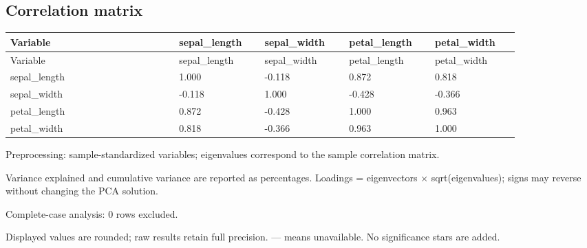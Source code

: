 \documentclass[UTF8]{ctexart}
\begin{document}
\subsection*{Correlation matrix}
\small
\setlength{\tabcolsep}{2pt}
\begin{longtable}{p{0.2867\linewidth}p{0.1433\linewidth}p{0.1433\linewidth}p{0.1433\linewidth}p{0.1433\linewidth}}
\toprule
Variable & sepal\_length & sepal\_width & petal\_length & petal\_width \\
\midrule
\endfirsthead
\toprule
Variable & sepal\_length & sepal\_width & petal\_length & petal\_width \\
\midrule
\endhead
sepal\_length & 1.000 & -0.118 & 0.872 & 0.818 \\
sepal\_width & -0.118 & 1.000 & -0.428 & -0.366 \\
petal\_length & 0.872 & -0.428 & 1.000 & 0.963 \\
petal\_width & 0.818 & -0.366 & 0.963 & 1.000 \\
\bottomrule
\end{longtable}
\noindent Preprocessing: sample-standardized variables; eigenvalues correspond to the sample correlation matrix.\par
\noindent Variance explained and cumulative variance are reported as percentages. Loadings = eigenvectors × sqrt(eigenvalues); signs may reverse without changing the PCA solution.\par
\noindent Complete-case analysis: 0 rows excluded.\par
\noindent Displayed values are rounded; raw results retain full precision. — means unavailable. No significance stars are added.\par
\end{document}
